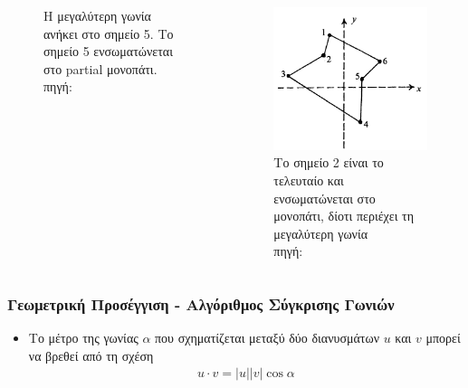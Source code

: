 \documentclass[xcolor=dvipsnames, 11pt]{beamer}
\newcommand{\el}{\selectlanguage{greek}}
\begin{document}
\begin{frame}
\begin{columns}
\begin{column}{0.3\textwidth}
\begin{figure}
				\caption{Η μεγαλύτερη γωνία ανήκει στο σημείο 5. Το σημείο 5 ενσωματώνεται στο partial μονοπάτι. \\ πηγή: \cite{16}}
			\end{figure} 
		\end{column}
		\begin{column}{0.3\textwidth}
			\begin{figure}
				\includegraphics[scale=0.2]{images/geometric_approach_angle4.png}
				\caption{Το σημείο 2 είναι το τελευταίο και ενσωματώνεται στο μονοπάτι, δίοτι περιέχει τη μεγαλύτερη γωνία\\ πηγή: \cite{16}}
			\end{figure} 
		\end{column}	
	\end{columns}
\end{frame}

\begin{frame}
	\frametitle{\el Γεωμετρική Προσέγγιση - Αλγόριθμος Σύγκρισης Γωνιών}
	\begin{itemize}		
		\item \el Το μέτρο της γωνίας \(α\) που σχηματίζεται μεταξύ δύο διανυσμάτων \(u\) και \(v\) μπορεί να βρεθεί από τη σχέση
		\begin{align*}
		u \cdot v = |u||v|\cos α
		\end{align*}
	\end{itemize}
\end{frame}
\end{document}
